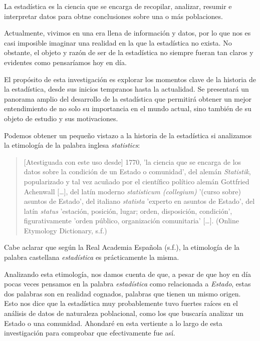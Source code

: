 \documentclass[12pt, a4paper]{article}
\begin{document}
\sffamily


\tableofcontents
\newpage

La estadística es la ciencia que se encarga de recopilar, analizar, resumir e interpretar datos para obtne conclusiones sobre una o más poblaciones.

Actualmente, vivimos en una era llena de información y datos, por lo que nos es casi imposible imaginar una realidad en la que la estadística no exista. No obstante, el objeto y razón de ser de la estadística no siempre fueran tan claros y evidentes como pensaríamos hoy en día.

El propósito de esta investigación es explorar los momentos clave de la historia de la estadística, desde sus inicios tempranos hasta la actualidad. Se presentará un panorama amplio del desarrollo de la estadística que permitirá obtener un mejor entendimiento de no solo su importancia en el mundo actual, sino también de su objeto de estudio y sus motivaciones.

Podemos obtener un pequeño vistazo a la historia de la estadística si analizamos la etimología de la palabra inglesa \textit{statistics}:

\begin{quote}
	[Atestiguada con este uso desde] 1770, 'la ciencia que se encarga de los datos sobre la condición de un Estado o comunidad', del alemán \textit{Statistik}, popularizado y tal vez acuñado por el científico político alemán Gottfried Achenwall […], del latín moderno \textit{statisticum (collegium)} '(curso sobre) asuntos de Estado', del italiano \textit{statista} 'experto en asuntos de Estado', del latín \textit{status} 'estación, posición, lugar; orden, disposición, condición', figurativamente 'orden público, organización comunitaria' […]. (Online Etymology Dictionary, s.f.)
\end{quote}

Cabe aclarar que según la Real Academia Española (s.f.), la etimología de la palabra castellana \textit{estadística} es prácticamente la misma.

Analizando esta etimología, nos damos cuenta de que, a pesar de que hoy en día pocas veces pensamos en la palabra \textit{estadística} como relacionada a \textit{Estado}, estas dos palabras son en realidad cognados, palabras que tienen un mismo origen. Esto nos dice que la estadística muy probablemente tuvo fuertes raíces en el análisis de datos de naturaleza poblacional, como los que buscaría analizar un Estado o una comunidad. Ahondaré en esta vertiente a lo largo de esta investigación para comprobar que efectivamente fue así.
\end{document}
